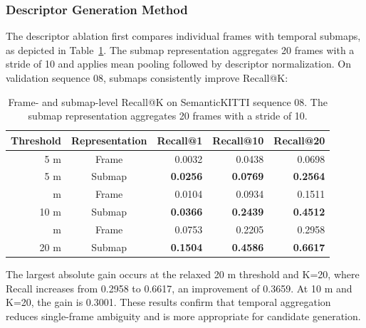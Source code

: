\subsubsection{Descriptor Generation Method}
The descriptor ablation first compares individual frames with temporal submaps, as depicted in Table~\ref{tab:ablation-frame-submap-recall}. The submap representation aggregates 20 frames with a stride of 10 and applies mean pooling followed by descriptor normalization. On validation sequence 08, submaps consistently improve Recall@K:
\begin{table}[t]
  \centering
  \caption{Frame- and submap-level Recall@K on SemanticKITTI sequence 08.
  The submap representation aggregates 20 frames with a stride of 10.}
  \label{tab:ablation-frame-submap-recall}
  \small
  \setlength{\tabcolsep}{4pt}
  \renewcommand{\arraystretch}{1.08}
  \begin{tabular}{@{}rcrrr@{}}
    \toprule
    Threshold & Representation & Recall@1 & Recall@10 & Recall@20 \\
    \midrule
    5 m  & Frame  & 0.0032 & 0.0438 & 0.0698 \\
    5 m  & Submap & \textbf{0.0256} & \textbf{0.0769} & \textbf{0.2564} \\
    \addlinespace
    10 m & Frame  & 0.0104 & 0.0934 & 0.1511 \\
    10 m & Submap & \textbf{0.0366} & \textbf{0.2439} & \textbf{0.4512} \\
    \addlinespace
    20 m & Frame  & 0.0753 & 0.2205 & 0.2958 \\
    20 m & Submap & \textbf{0.1504} & \textbf{0.4586} & \textbf{0.6617} \\
    \bottomrule
  \end{tabular}
\end{table}
The largest absolute gain occurs at the relaxed 20 m threshold and K=20, where Recall increases from 0.2958 to 0.6617, an improvement of 0.3659. At 10 m and K=20, the gain is 0.3001. These results confirm that temporal aggregation reduces single-frame ambiguity and is more appropriate for candidate generation.

